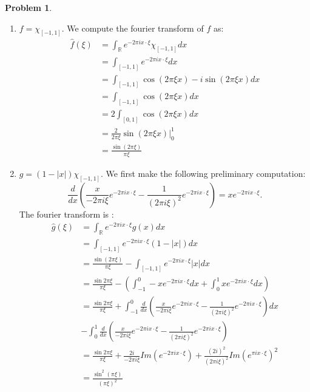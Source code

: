 \documentclass[12pt, a4paper]{article}
\title{}
\author{A.N.}
\date{\today}
\newtheorem{problem}{Problem}
\theoremstyle{definition}
\newcommand{\R}{\mathbb{R}}                           %
\begin{document}
\begin{problem}
\end{problem}
\begin{enumerate}[label = \textbf{\roman*)}, leftmargin = 0pt]
	\item $f = \chi_{[-1,1]}$.
We compute the fourier transform of $f$ as:
\begin{align*}
	\hat{f}(\xi) & = \int_{\R} e^{-2\pi i x \cdot \xi} \chi_{[-1,1]} dx
	\\ & = \int_{[-1,1]} e^{-2\pi i x \cdot \xi} dx
	\\ & = \int_{[-1,1]} \cos \left( 2\pi \xi x \right) - i \sin \left( 2\pi \xi x \right) dx
	\\ & = \int_{[-1,1]} \cos \left( 2\pi \xi x \right) dx \tag{ integral of $\sin$ on symmetric domain is 0}
	\\ & = 2\int_{[0,1]} \cos \left( 2\pi \xi x \right) dx
	\\ & =  \frac{ 2 }{ 2\pi \xi }\sin \left( 2\pi \xi x \right)\Big|_{0}^1
	\\ & = \frac{ \sin \left( 2\pi \xi \right) }{ \pi \xi }
\end{align*}
\item $g = \left( 1 -|x| \right) \chi_{[-1,1]}$. 
We first make the following preliminary computation: 
		$$ \frac{ d }{ dx } \left( \frac{ x }{ -2\pi i \xi } e^{ -2\pi i x \cdot \xi} - \frac{ 1 }{ \left( 2\pi i \xi \right)^2 } e^{-2\pi i x \cdot \xi}\right)  = x e^{-2\pi i x \cdot \xi}.$$ 
	The fourier transform is :
	\begin{align*}
		\hat{g} (\xi ) & = \int_{\R} e^{-2\pi i x \cdot \xi } g(x) dx
		\\ & = \int_{[-1,1]} e^{-2\pi i x \cdot \xi} \left( 1-|x| \right) dx
		\\ & = \frac{ \sin \left( 2\pi \xi \right) }{ \pi \xi } - \int_{[-1,1]} e^{-2\pi i x \cdot \xi} |x| dx
		\\ & = \frac{ \sin 2\pi \xi }{ \pi \xi }- \left( \int_{-1}^0 -x e^{-2 \pi i x \cdot \xi} dx + \int_0^1 xe^{-2\pi i x \cdot \xi} dx\right) 
		\\ & = \frac{ \sin 2\pi \xi }{ \pi \xi } +  \int_{-1}^0 \frac{ d }{ dx } \left( \frac{ x }{ -2\pi i \xi } e^{ -2\pi i x \cdot \xi} - \frac{ 1 }{ \left( 2\pi i \xi \right)^2 } e^{-2\pi i x \cdot \xi}\right) dx
		\\ &- \int_0^1  \frac{ d }{ dx } \left( \frac{ x }{ -2\pi i \xi } e^{ -2\pi i x \cdot \xi} - \frac{ 1 }{ \left( 2\pi i \xi \right)^2 } e^{-2\pi i x \cdot \xi}\right)    
		\\ & = \frac{ \sin 2\pi \xi }{ \pi \xi } + \frac{ 2i  }{ -2\pi i \xi } Im \left( e^{-2\pi ix \cdot \xi} \right) + \frac{ (2i)^2}{ \left( 2\pi i \xi \right)^2 } Im \left( e^{\pi i x \cdot \xi} \right)^2
		\\ & = \frac{ \sin^2 \left( \pi \xi \right) }{ \left( \pi \xi \right)^2 }
	\end{align*}
\end{enumerate}
\end{document}
